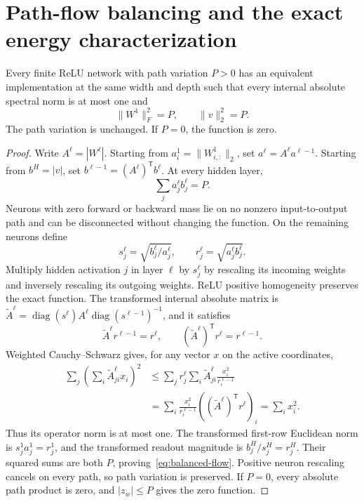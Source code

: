 \section{Path-flow balancing and the exact energy characterization}
\begin{lemma}
\label{lem:flow}
Every finite ReLU network with path variation $P>0$ has an equivalent implementation at the same width and depth such that every internal absolute spectral norm is at most one and
\begin{equation}
 \|W^1\|_F^2=P,\qquad \|v\|_2^2=P.
 \label{eq:balanced-flow}
\end{equation}
The path variation is unchanged. If $P=0$, the function is zero.
\end{lemma}
\begin{proof}
Write $A^\ell=|W^\ell|$. Starting from $a^1_i=\|W^1_{i,:}\|_2$, set $a^\ell=A^\ell a^{\ell-1}$. Starting from $b^H=|v|$, set $b^{\ell-1}=(A^\ell)^{\mathsf T}b^\ell$. At every hidden layer,
\[
 \sum_j a^\ell_jb^\ell_j=P.
\]
Neurons with zero forward or backward mass lie on no nonzero input-to-output path and can be disconnected without changing the function. On the remaining neurons define
\[
 s^\ell_j=\sqrt{b^\ell_j/a^\ell_j},\qquad
 r^\ell_j=\sqrt{a^\ell_jb^\ell_j}.
\]
Multiply hidden activation $j$ in layer $\ell$ by $s^\ell_j$ by rescaling its incoming weights and inversely rescaling its outgoing weights. ReLU positive homogeneity preserves the exact function. The transformed internal absolute matrix is
$\widetilde A^\ell=\operatorname{diag}(s^\ell)A^\ell\operatorname{diag}(s^{\ell-1})^{-1}$, and it satisfies
\[
 \widetilde A^\ell r^{\ell-1}=r^\ell,\qquad
 (\widetilde A^\ell)^{\mathsf T}r^\ell=r^{\ell-1}.
\]
Weighted Cauchy--Schwarz gives, for any vector $x$ on the active coordinates,
\begin{align*}
 \sum_j\left(\sum_i\widetilde A^\ell_{ji}x_i\right)^2
 &\le\sum_j r^\ell_j\sum_i\widetilde A^\ell_{ji}\frac{x_i^2}{r^{\ell-1}_i}\\
 &=\sum_i\frac{x_i^2}{r^{\ell-1}_i}
                ((\widetilde A^\ell)^{\mathsf T}r^\ell)_i
 =\sum_i x_i^2.
\end{align*}
Thus its operator norm is at most one. The transformed first-row Euclidean norm is $s^1_ja^1_j=r^1_j$, and the transformed readout magnitude is $b^H_j/s^H_j=r^H_j$. Their squared sums are both $P$, proving~\eqref{eq:balanced-flow}. Positive neuron rescaling cancels on every path, so path variation is preserved. If $P=0$, every absolute path product is zero, and $|z_w|\le P$ gives the zero function.
\end{proof}

